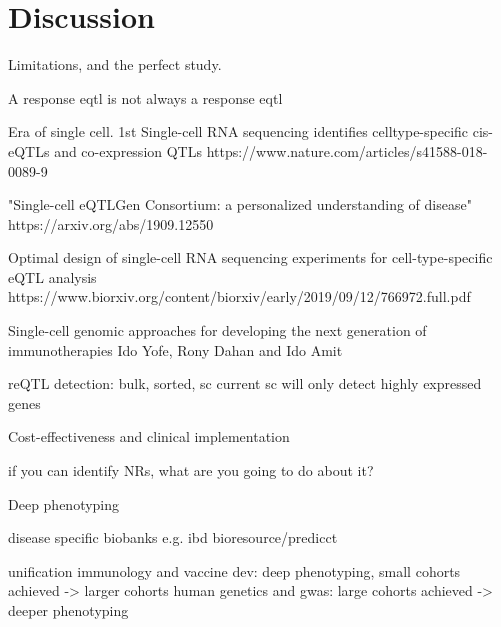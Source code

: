%
%

\chapter{Discussion}

Limitations, and the perfect study.

A response eqtl is not always a response eqtl

Era of single cell.
    1st
    Single-cell RNA sequencing identifies celltype-specific cis-eQTLs and co-expression QTLs
    https://www.nature.com/articles/s41588-018-0089-9

    "Single-cell eQTLGen Consortium: a personalized understanding of disease"
    https://arxiv.org/abs/1909.12550

    Optimal design of single-cell RNA sequencing experiments for cell-type-specific eQTL analysis
    https://www.biorxiv.org/content/biorxiv/early/2019/09/12/766972.full.pdf

    Single-cell genomic approaches for developing the next generation of immunotherapies Ido Yofe, Rony Dahan and Ido Amit


    reQTL detection: bulk, sorted, sc
    current sc will only detect highly expressed genes

Cost-effectiveness and clinical implementation

    if you can identify NRs, what are you going to do about it?

Deep phenotyping
    
    disease specific biobanks e.g. ibd bioresource/predicct

unification
    immunology and vaccine dev: deep phenotyping, small cohorts achieved -> larger cohorts
    human genetics and gwas: large cohorts achieved -> deeper phenotyping

